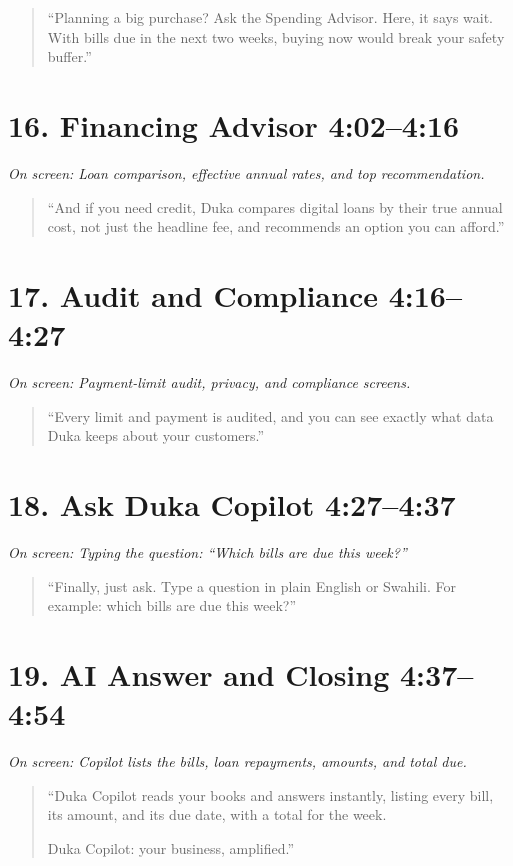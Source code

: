 \documentclass[11pt,a4paper]{article}
\newcommand{\timestamp}[1]{%
  \textcolor{dukablue}{\textbf{#1}}%
}
\newcommand{\screen}[1]{%
  \par\textit{\textcolor{mutedgray}{On screen: #1}}\par
}
\newcommand{\narration}[1]{%
  \begin{quote}
    \smallskip
    ``#1''
    \smallskip
  \end{quote}
}
\begin{document}
\narration{Planning a big purchase? Ask the Spending Advisor.
Here, it says wait. With bills due in the next two weeks,
buying now would break your safety buffer.}

\section*{16. Financing Advisor \hfill
\small \timestamp{4:02--4:16}}

\screen{Loan comparison, effective annual rates, and
top recommendation.}

\narration{And if you need credit, Duka compares digital
loans by their true annual cost, not just the headline fee,
and recommends an option you can afford.}

\section*{17. Audit and Compliance \hfill
\small \timestamp{4:16--4:27}}

\screen{Payment-limit audit, privacy, and compliance screens.}

\narration{Every limit and payment is audited, and you can
see exactly what data Duka keeps about your customers.}

\section*{18. Ask Duka Copilot \hfill
\small \timestamp{4:27--4:37}}

\screen{Typing the question: ``Which bills are due this week?''}

\narration{Finally, just ask. Type a question in plain English
or Swahili. For example: which bills are due this week?}

\section*{19. AI Answer and Closing \hfill
\small \timestamp{4:37--4:54}}

\screen{Copilot lists the bills, loan repayments, amounts,
and total due.}

\narration{Duka Copilot reads your books and answers instantly,
listing every bill, its amount, and its due date, with a
total for the week.

Duka Copilot: your business, amplified.}
\end{document}
